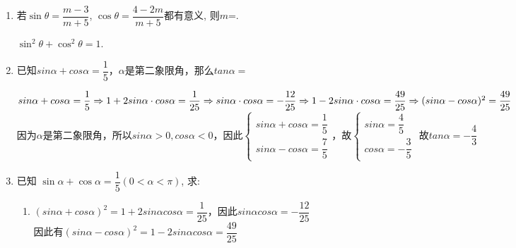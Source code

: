 \begin{enumerate}
    \item 若$\sin\theta=\dfrac{m-3}{m+5}$, $\cos\theta=\dfrac{4-2m}{m+5}$都有意义, 则$m$=. 
    \begin{jieda}
    $\sin^2\theta+\cos^2\theta=1$. 
    \end{jieda}
    \item 已知$sin\alpha + cos\alpha = \dfrac{1}{5}$，$\alpha$是第二象限角，那么$tan\alpha = $
    \begin{jieda}
        $sin\alpha + cos\alpha = \dfrac{1}{5}\\
        \Rightarrow 1 + 2sin\alpha \cdot cos\alpha = \dfrac{1}{25} \Rightarrow sin\alpha \cdot cos\alpha = -\dfrac{12}{25} \Rightarrow 1 - 2sin\alpha \cdot cos\alpha = \dfrac{49}{25} \Rightarrow (sin\alpha - cos\alpha)^2 = \dfrac{49}{25}$ \\
        因为$\alpha$是第二象限角，所以$sin\alpha > 0, cos\alpha < 0$，因此$\left \{ \begin{array}{l}
             sin\alpha + cos\alpha = \dfrac{1}{5}  \\
             sin\alpha - cos\alpha = \dfrac{7}{5}
        \end{array} \right.$，故$\left \{ \begin{array}{l}
             sin\alpha = \dfrac{4}{5}  \\
             cos\alpha = -\dfrac{3}{5}
        \end{array} \right.$
        故$tan\alpha = -\dfrac{4}{3}$
    \end{jieda}
    \item 已知 $\sin \alpha+\cos \alpha=\dfrac{1}{5}\left(0<\alpha<\pi\right)$, 求: \\
    \begin{jieda}
        \begin{enumerate}
            \item $\left(sin\alpha+cos\alpha\right)^2 = 1 + 2sin\alpha cos\alpha = \dfrac{1}{25}$，因此$sin\alpha cos\alpha = -\dfrac{12}{25}$ \\
            因此有$\left(sin\alpha - cos\alpha\right)^2 = 1 - 2sin\alpha cos\alpha = \dfrac{49}{25}$ \\

\end{enumerate}
\end{jieda}
\end{enumerate}
